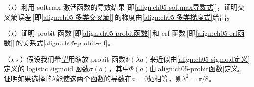 \documentclass[../../main.tex]{subfiles}
\begin{document}
\begin{exercise}\label{exercise:ch05-22}
（$\star$）利用 softmax 激活函数的导数结果\,[即\eqref{align:ch05-softmax导数式}]，证明交叉熵误差\,[即\eqref{align:ch05-多类交叉熵}]\,的梯度由\eqref{align:ch05-多类梯度式}给出。
\end{exercise}

\begin{exercise}\label{exercise:ch05-23}
（$\star$）证明 probit 函数\,[即\eqref{align:ch05-probit函数}]\,和 erf 函数\,[即\eqref{align:ch05-erf函数}]\,的关系式\eqref{align:ch05-probit-erf}。
\end{exercise}

\begin{exercise}\label{exercise:ch05-24}
（$\star\star$）假设我们希望用缩放 probit 函数$\Phi(\lambda a)$来近似由\eqref{align:ch05-sigmoid定义}定义的 logistic sigmoid 函数$\sigma(a)$，其中$\Phi(a)$由\eqref{align:ch05-probit函数}定义。证明如果选择的$\lambda$能使这两个函数的导数在$a=0$处相等，则$\lambda^{2}=\pi/8$。
\end{exercise}
\end{document}
